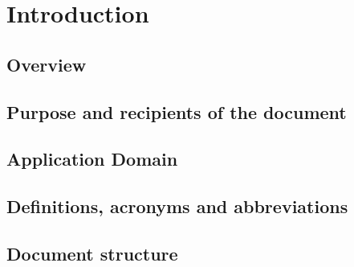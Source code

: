 
\chapter{Introduction}
\label{chap:introduction}

\section{Overview}

\section{Purpose and recipients of the document}

 
\section{Application Domain}

 
\section{Definitions, acronyms and abbreviations}


\section{Document structure} 

